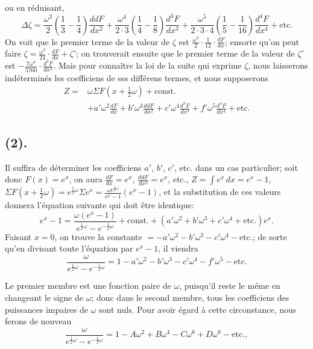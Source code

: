 \documentclass{article}
\begin{document}
ou en réduisant,
\[ \Delta\zeta=\frac{\omega^{3}}{2}\left(\frac{1}{3}-\frac{1}{4}\right)\frac{ddF}{dx^{2}}+\frac{\omega^{4}}{2\cdot3}\left(\frac{1}{4}-\frac{1}{8}\right)\frac{d^{3}F}{dx^{3}}+\frac{\omega^{5}}{2\cdot3\cdot4}\left(\frac{1}{5}-\frac{1}{16}\right)\frac{d^{4}F}{dx^{4}}+\text{etc.} \]
On voit que le premier terme de la valeur de $\zeta$ est $\frac{\omega^{2}}{2}\cdot\frac{1}{12}\cdot\frac{dF}{dx}$; ensorte qu'on peut faire $\zeta=\frac{\omega^{2}}{24}\cdot\frac{dF}{dx}+\zeta'$; on trouverait ensuite que le premier terme de la valeur de $\zeta'$ est $-\frac{7\omega^{4}}{5760}\cdot\frac{d^{3}F}{dx^{3}}$. Mais pour connaître la loi de la suite qui exprime $\zeta$, nous laisserons indéterminés les coefficiens de ses différens termes, et nous supposerons
\[ \begin{aligned} Z={}&\omega\Sigma F(x+\tfrac{1}{2}\omega)+\text{const.}\\ &+a'\omega^{2}\frac{dF}{dx}+b'\omega^{3}\frac{ddF}{dx^{2}}+c'\omega^{4}\frac{d^{3}F}{dx^{3}}+f'\omega^{5}\frac{d^{4}F}{dx^{4}}+\text{etc.} \end{aligned} \]

\subsection*{(2).}

Il suffira de déterminer les coefficiens $a'$, $b'$, $c'$, etc. dans un cas particulier; soit donc $F(x)=e^{x}$, on aura $\frac{dF}{dx}=e^{x}$, $\frac{ddF}{dx^{2}}=e^{x}$, etc., $\displaystyle Z=\int e^{x}\,dx=e^{x}-1$, $\Sigma F(x+\frac{1}{2}\omega)=e^{\frac{1}{2}\omega}\Sigma e^{x}=\frac{\omega e^{\frac{1}{2}\omega}}{e^{\omega}-1}(e^{x}-1)$, et la substitution de ces valeurs donnera l'équation suivante qui doit être identique:
\[ e^{x}-1=\frac{\omega(e^{x}-1)}{e^{\frac{1}{2}\omega}-e^{-\frac{1}{2}\omega}}+\text{const.}+(a'\omega^{2}+b'\omega^{3}+c'\omega^{4}+\text{etc.})e^{x}. \]
Faisant $x=0$, on trouve la constante $=-a'\omega^{2}-b'\omega^{3}-c'\omega^{4}-\text{etc.}$; de sorte qu'en divisant toute l'équation par $e^{x}-1$, il viendra
\[ \frac{\omega}{e^{\frac{1}{2}\omega}-e^{-\frac{1}{2}\omega}}=1-a'\omega^{2}-b'\omega^{3}-c'\omega^{4}-f'\omega^{5}-\text{etc.} \]

Le premier membre est une fonction paire de $\omega$, puisqu'il reste le même en changeant le signe de $\omega$; donc dans le second membre, tous les coefficiens des puissances impaires de $\omega$ sont nuls. Pour avoir égard à cette circonstance, nous ferons de nouveau
\[ \frac{\omega}{e^{\frac{1}{2}\omega}-e^{-\frac{1}{2}\omega}}=1-A\omega^{2}+B\omega^{4}-C\omega^{6}+D\omega^{8}-\text{etc.}, \tag{1} \]
\end{document}
